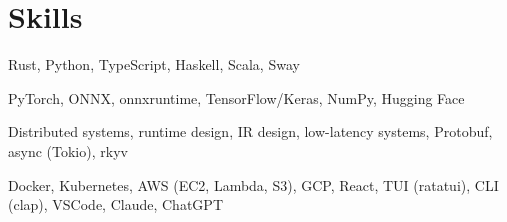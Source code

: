 \section{Skills}

%
{}%
{}%
{\small Rust, Python, TypeScript, Haskell, Scala, Sway \normalsize}%
{}

%
{}%
{}%
{\small PyTorch, ONNX, onnxruntime, TensorFlow/Keras, NumPy, Hugging Face \normalsize}%
{}

%
{}%
{}%
{\small Distributed systems, runtime design, IR design, low-latency systems, Protobuf, async (Tokio), rkyv \normalsize}%
{}

%
{}%
{}%
{\small Docker, Kubernetes, AWS (EC2, Lambda, S3), GCP, React, TUI (ratatui), CLI (clap), VSCode, Claude, ChatGPT \normalsize}%
{}
